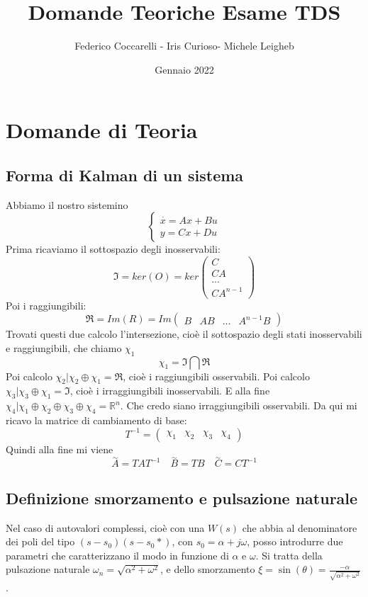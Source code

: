 \documentclass{article}
\title{Domande Teoriche Esame TDS}
\author{Federico Coccarelli - Iris Curioso- Michele Leigheb}
\date{Gennaio 2022}
\begin{document}
\pagecolor{gray!30}
\large
\maketitle

\tableofcontents{}


\section{Domande di Teoria}

\subsection{Forma di Kalman di un sistema}
Abbiamo il nostro sistemino
\[ \begin{cases} \overset{\cdot}{x} = Ax+Bu\\y=Cx+Du \end{cases}\]
Prima ricaviamo il sottospazio degli inosservabili:
\[
\mathfrak{I} = ker(O) = ker\begin{pmatrix}C\\CA\\...\\CA^{n-1}\end{pmatrix}  
\]
Poi i raggiungibili:
\[
    \mathfrak{R} = Im(R) = Im\begin{pmatrix}B&AB&...&A^{n-1}B\end{pmatrix}
\]
Trovati questi due calcolo l'intersezione, cioè il sottospazio degli stati inosservabili e raggiungibili,
che chiamo $\chi_1$
\[
  \chi_1 =   \mathfrak{I}\bigcap\mathfrak{R}
\]
Poi calcolo $\chi_2 | \chi_2 \oplus  \chi_1 = \mathfrak{R}$, cioè i raggiungibili osservabili.
Poi calcolo $\chi_3 | \chi_3 \oplus  \chi_1 = \mathfrak{I}$, cioè i irraggiungibili inosservabili.
E alla fine $\chi_4 | \chi_1\oplus \chi_2 \oplus\chi_3 \oplus\chi_4  = \mathbb{R}^n$.
Che credo siano irraggiungibili osservabili.
Da qui mi ricavo la matrice di cambiamento di base:
\[ T^{-1} = \begin{pmatrix}\chi_1&\chi_2&\chi_3&\chi_4 \end{pmatrix}\]
Quindi alla fine mi viene 
\[
    \overset{\sim}{A} = TAT^{-1}\quad \overset{\sim}{B} = TB \quad \overset{\sim}{C} = CT^{-1}
\]


\subsection{Definizione smorzamento e pulsazione naturale}
Nel caso di autovalori complessi, cioè con una $W(s)$ che abbia  al denominatore 
dei poli del tipo $(s-s_0)(s-s_0*)$, con $s_0 = \alpha+j\omega$,
posso introdurre due parametri che caratterizzano il modo in funzione di $\alpha$ e $\omega$.
Si tratta della pulsazione naturale $\omega _n = \sqrt{\alpha^2 + \omega^2}$,
e dello smorzamento $\xi = \sin(\theta) = \frac{-\alpha}{\sqrt{\alpha^2 + \omega^2}} $.
\end{document}
